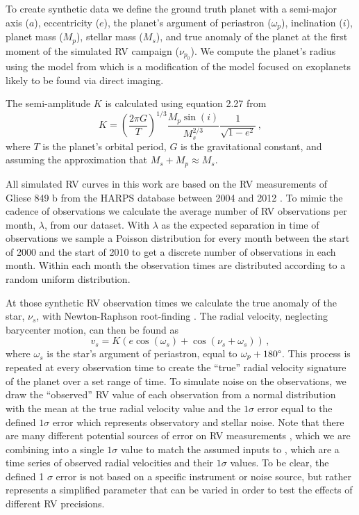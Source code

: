 To create synthetic data we define the ground truth planet with a semi-major axis ($a$),
eccentricity ($e$), the planet's argument of periastron ($\omega_p$), inclination ($i$), planet mass
($M_p$), stellar mass ($M_s$), and true anomaly of the planet at the first moment of the simulated RV
campaign ($\nu_{p_0}$). We compute the planet's radius using the model from
\citet{savranskyExplorationDynamical2019} which is a modification of the  model \citep{chenProbabilisticForecastingMasses2016}
focused on exoplanets likely to be found via direct imaging.

The semi-amplitude $K$ is calculated using equation 2.27 from \citet{Perryman2018a}
\begin{equation}\label{eq:K}
    K = \left( \frac{2\pi G}{T}\right)^{1/3} \frac{M_p \sin(i)}{M_s^{2/3}} \frac{1}{\sqrt{1-e^2}} \,,
\end{equation}
where $T$ is the planet's orbital period, $G$ is the gravitational constant, and assuming the
approximation that $M_s+M_p \approx M_s$. 

All simulated RV curves in this work are based on the RV measurements of Gliese 849 b from the
HARPS database between 2004 and 2012 \citep{Mayor2003a}. To mimic the cadence of observations we
calculate the average number of RV observations per month, $\lambda $, from our dataset. With
$\lambda $ as the expected separation in time of observations we sample a Poisson distribution for every
month between the start of 2000 and the start of 2010 to get a discrete number of observations in
each month. Within each month the observation times are distributed according to a random uniform
distribution.

At those synthetic RV observation times we calculate the true anomaly of the star, $\nu_s$, with
Newton-Raphson root-finding \citep{Murray2000}.  The radial velocity, neglecting barycenter motion, can then be found
as \citep{Perryman2018a}
\begin{equation}
    v_s = K \left(e \cos(\omega_s) + \cos(\nu_s + \omega_s)\right) \,,
\end{equation}
where $\omega_s$ is the star's argument of periastron, equal to $\omega_{p}+180\degree$.  This
process is repeated at every observation time to create the ``true'' radial velocity signature of
the planet over a set range of time.  To simulate noise on the observations, we draw the
``observed'' RV value of each observation from a normal distribution with the mean at the true
radial velocity value and the $1 \sigma$ error equal to the defined $1 \sigma $ error which
represents observatory and stellar noise. Note that there are many different potential sources of
error on RV measurements \citep[see, e.g.,~][]{Fischer2016a}, which we are combining into a single
$1 \sigma $ value to match the assumed inputs to , which are a time series of observed
radial velocities and their $1 \sigma $ values. To be clear, the defined 1 $\sigma $ error
is not based on a specific instrument or noise source, but rather represents a
simplified parameter that can be varied in order to test the effects of
different RV precisions.



